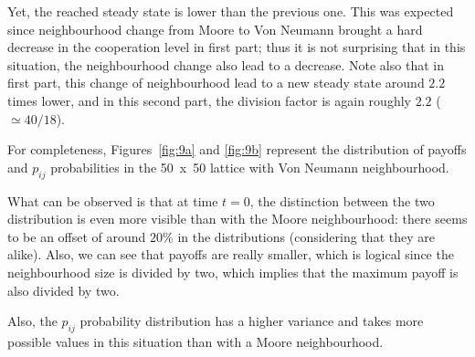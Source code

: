 \documentclass{article}
\begin{document}
Yet, the reached steady state is lower than the previous one. This was expected since neighbourhood change
from Moore to Von Neumann brought a hard decrease in the cooperation level in first part; thus it is not
surprising that in this situation, the neighbourhood change also lead to a decrease. Note also that in first
part, this change of neighbourhood lead to a new steady state around $2.2$ times lower, and in this second
part, the division factor is again roughly $2.2$ ($\simeq 40/18$).

For completeness, Figures~\ref{fig:9a} and \ref{fig:9b} represent the distribution of payoffs and $p_{ij}$
probabilities in the 50~x~50 lattice with Von Neumann neighbourhood.

What can be observed is that at time $t=0$, the distinction between the two distribution is even more visible
than with the Moore neighbourhood: there seems to be an offset of around $20\%$ in the distributions (considering
that they are alike). Also, we can see that payoffs are really smaller, which is logical since the neighbourhood
size is divided by two, which implies that the maximum payoff is also divided by two.

Also, the $p_{ij}$ probability distribution has a higher variance and takes more possible values in this situation
than with a Moore neighbourhood.
\end{document}

